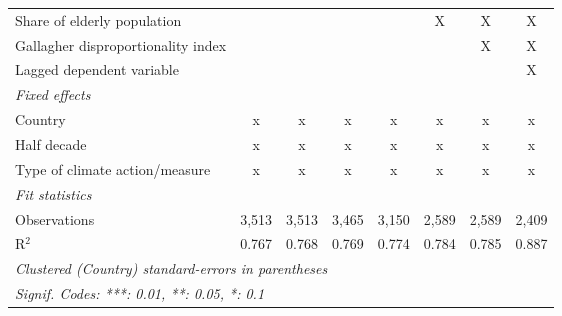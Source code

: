 \begin{table}[htbp]
\begin{tabular}{lccccccc}
      Share of elderly population                                     &               &               &              &              & X           & X           & X\\  
      Gallagher disproportionality index                              &               &               &              &              &             & X           & X\\  
      Lagged dependent variable                                       &               &               &              &              &             &             & X\\  
      \emph{Fixed effects}\\
      Country                                                         & x             & x             & x            & x            & x           & x           & x\\  
      Half decade                                                     & x             & x             & x            & x            & x           & x           & x\\  
      Type of climate action/measure                                  & x             & x             & x            & x            & x           & x           & x\\  
      \midrule \emph{Fit statistics}\\
      Observations                                                    & 3,513         & 3,513         & 3,465        & 3,150        & 2,589       & 2,589       & 2,409\\  
      R$^2$                                                           & 0.767         & 0.768         & 0.769        & 0.774        & 0.784       & 0.785       & 0.887\\  
      \midrule
      \multicolumn{8}{l}{\emph{Clustered (Country) standard-errors in parentheses}}\\
      \multicolumn{8}{l}{\emph{Signif. Codes: ***: 0.01, **: 0.05, *: 0.1}}\\
   \end{tabular}
\end{table}


